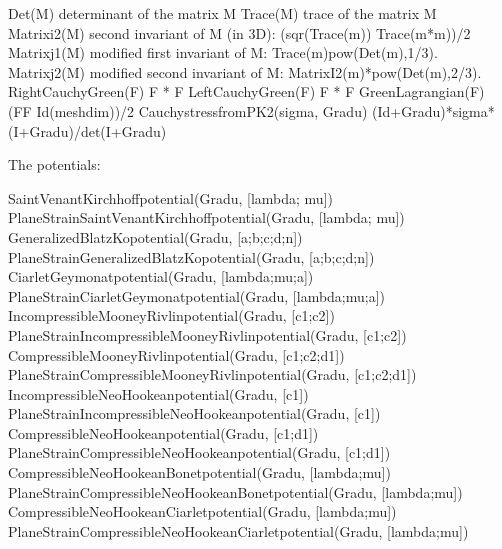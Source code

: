 \documentclass[a4paper,11pt,english]{sphinxmanual}
\begin{document}
\begin{sphinxVerbatim}[commandchars=\\\{\}]
Det(M)                                \PYGZpc{} determinant of the matrix M
Trace(M)                              \PYGZpc{} trace of the matrix M
Matrix\PYGZus{}i2(M)                          \PYGZpc{} second invariant of M (in 3D): (sqr(Trace(m)) \PYGZhy{} Trace(m*m))/2
Matrix\PYGZus{}j1(M)                          \PYGZpc{} modified first invariant of M: Trace(m)pow(Det(m),\PYGZhy{}1/3).
Matrix\PYGZus{}j2(M)                          \PYGZpc{} modified second invariant of M: Matrix\PYGZus{}I2(m)*pow(Det(m),\PYGZhy{}2/3).
Right\PYGZus{}Cauchy\PYGZus{}Green(F)                 \PYGZpc{} F\PYGZsq{} * F
Left\PYGZus{}Cauchy\PYGZus{}Green(F)                  \PYGZpc{} F * F\PYGZsq{}
Green\PYGZus{}Lagrangian(F)                   \PYGZpc{} (F\PYGZsq{}F \PYGZhy{} Id(meshdim))/2
Cauchy\PYGZus{}stress\PYGZus{}from\PYGZus{}PK2(sigma, Grad\PYGZus{}u) \PYGZpc{} (Id+Grad\PYGZus{}u)*sigma*(I+Grad\PYGZus{}u\PYGZsq{})/det(I+Grad\PYGZus{}u)
\end{sphinxVerbatim}

The potentials:

\begin{sphinxVerbatim}[commandchars=\\\{\}]
Saint\PYGZus{}Venant\PYGZus{}Kirchhoff\PYGZus{}potential(Grad\PYGZus{}u, [lambda; mu])
Plane\PYGZus{}Strain\PYGZus{}Saint\PYGZus{}Venant\PYGZus{}Kirchhoff\PYGZus{}potential(Grad\PYGZus{}u, [lambda; mu])
Generalized\PYGZus{}Blatz\PYGZus{}Ko\PYGZus{}potential(Grad\PYGZus{}u, [a;b;c;d;n])
Plane\PYGZus{}Strain\PYGZus{}Generalized\PYGZus{}Blatz\PYGZus{}Ko\PYGZus{}potential(Grad\PYGZus{}u, [a;b;c;d;n])
Ciarlet\PYGZus{}Geymonat\PYGZus{}potential(Grad\PYGZus{}u, [lambda;mu;a])
Plane\PYGZus{}Strain\PYGZus{}Ciarlet\PYGZus{}Geymonat\PYGZus{}potential(Grad\PYGZus{}u, [lambda;mu;a])
Incompressible\PYGZus{}Mooney\PYGZus{}Rivlin\PYGZus{}potential(Grad\PYGZus{}u, [c1;c2])
Plane\PYGZus{}Strain\PYGZus{}Incompressible\PYGZus{}Mooney\PYGZus{}Rivlin\PYGZus{}potential(Grad\PYGZus{}u, [c1;c2])
Compressible\PYGZus{}Mooney\PYGZus{}Rivlin\PYGZus{}potential(Grad\PYGZus{}u, [c1;c2;d1])
Plane\PYGZus{}Strain\PYGZus{}Compressible\PYGZus{}Mooney\PYGZus{}Rivlin\PYGZus{}potential(Grad\PYGZus{}u, [c1;c2;d1])
Incompressible\PYGZus{}Neo\PYGZus{}Hookean\PYGZus{}potential(Grad\PYGZus{}u, [c1])
Plane\PYGZus{}Strain\PYGZus{}Incompressible\PYGZus{}Neo\PYGZus{}Hookean\PYGZus{}potential(Grad\PYGZus{}u, [c1])
Compressible\PYGZus{}Neo\PYGZus{}Hookean\PYGZus{}potential(Grad\PYGZus{}u, [c1;d1])
Plane\PYGZus{}Strain\PYGZus{}Compressible\PYGZus{}Neo\PYGZus{}Hookean\PYGZus{}potential(Grad\PYGZus{}u, [c1;d1])
Compressible\PYGZus{}Neo\PYGZus{}Hookean\PYGZus{}Bonet\PYGZus{}potential(Grad\PYGZus{}u, [lambda;mu])
Plane\PYGZus{}Strain\PYGZus{}Compressible\PYGZus{}Neo\PYGZus{}Hookean\PYGZus{}Bonet\PYGZus{}potential(Grad\PYGZus{}u, [lambda;mu])
Compressible\PYGZus{}Neo\PYGZus{}Hookean\PYGZus{}Ciarlet\PYGZus{}potential(Grad\PYGZus{}u, [lambda;mu])
Plane\PYGZus{}Strain\PYGZus{}Compressible\PYGZus{}Neo\PYGZus{}Hookean\PYGZus{}Ciarlet\PYGZus{}potential(Grad\PYGZus{}u, [lambda;mu])
\end{sphinxVerbatim}
\end{document}
